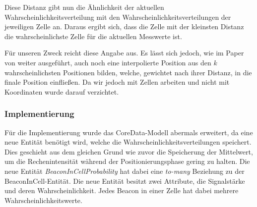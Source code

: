 Diese Distanz gibt nun die Ähnlichkeit der aktuellen Wahrscheinlichkeitsverteilung mit den Wahrscheinlichkeitsverteilungen der jeweiligen Zelle an. Daraus ergibt sich, dass die Zelle mit der kleinsten Distanz die wahrscheinlichste Zelle für die aktuellen Messwerte ist.

Für unseren Zweck reicht diese Angabe aus. Es lässt sich jedoch, wie im Paper von \citet{wifiFingerprintProbability} weiter ausgeführt, auch noch eine interpolierte Position aus den $k$ wahrscheinlichsten Positionen bilden, welche, gewichtet nach ihrer Distanz, in die finale Position einfließen. Da wir jedoch mit Zellen arbeiten und nicht mit Koordinaten wurde darauf verzichtet. 

\subsubsection{Implementierung}
\label{sec:implementation:fingerprinting:positioning:probability:implementiation}
Für die Implementierung wurde das CoreData-Modell abermals erweitert, da eine neue Entität benötigt wird, welche die Wahrscheinlichkeitsverteilungen speichert. Dies geschieht aus dem gleichen Grund wie zuvor die Speicherung der Mittelwert, um die Rechenintensität während der Positionierungsphase gering zu halten.
Die neue Entität \emph{BeaconInCellProbability} hat dabei eine \emph{to-many} Beziehung zu der BeaconInCell-Entität. Die neue Entität besitzt zwei Attribute, die Signalstärke und deren Wahrscheinlichkeit. Jedes Beacon in einer Zelle hat dabei mehrere Wahrscheinlichkeitswerte.


